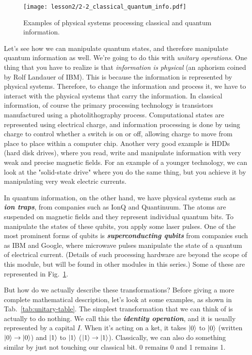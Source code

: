 \begin{figure}[H]
    \centering
    \texttt{[image: lesson2/2-2\_classical\_quantum\_info.pdf]}
    \caption[Physical information-processing systems.]{Examples of physical systems processing classical and quantum information.}
    \label{fig:physical-system}
\end{figure}

Let's see how we can manipulate quantum states, and therefore manipulate quantum information as well. We're going to do this with \emph{unitary operations}. One thing that you have to realize is that \emph{information is physical} (an aphorism coined by Rolf Landauer of IBM). This is because the information is represented by physical systems. Therefore, to change the information and process it, we have to interact with the physical systems that carry the information. In classical information, of course the primary processing technology is transistors manufactured using a photolithography process.  Computational states are represented using electrical charge, and information processing is done by using charge to control whether a switch is on or off, allowing charge to move from place to place within a computer chip.  Another very good example is HDDs (hard disk drives), where you read, write and manipulate information with very weak and precise magnetic fields. For an example of a younger technology, we can look at the "solid-state drive" where you do the same thing, but you achieve it by manipulating very weak electric currents.

In quantum information, on the other hand, we have physical systems such as \textbf{\emph{ion traps}}, from companies such as IonQ and Quantinuum. The atoms are suspended on magnetic fields and they represent individual quantum bits. To manipulate the states of these qubits, you apply some laser pulses.  One of the most prominent forms of qubits is \textbf{\emph{superconducting qubits}} from companies such as IBM and Google, where microwave pulses manipulate the state of a quantum of electrical current. (Details of such processing hardware are beyond the scope of this module, but will be found in other modules in this series.) Some of these are represented in Fig.~\ref{fig:physical-system}.

But how do we actually describe these transformations? Before giving a more complete mathematical description, let's look at some examples, as shown in Tab.~\ref{tab:unitary-table}. The simplest transformation that we can think of is actually to do nothing. We call this the \textbf{\emph{identity operation}}, and it is usually represented by a capital $I$. When it's acting on a ket, it takes $\left| 0 \right\rangle$ to $\left| 0 \right\rangle$  (written $\left| 0 \right\rangle\rightarrow\left| 0 \right\rangle$) and $\left| 1 \right\rangle$ to $\left| 1 \right\rangle$ ($\left| 1 \right\rangle\rightarrow\left| 1 \right\rangle$). Classically, we can also do something similar by just not touching our classical bit. 0 remains 0 and 1 remains 1.

